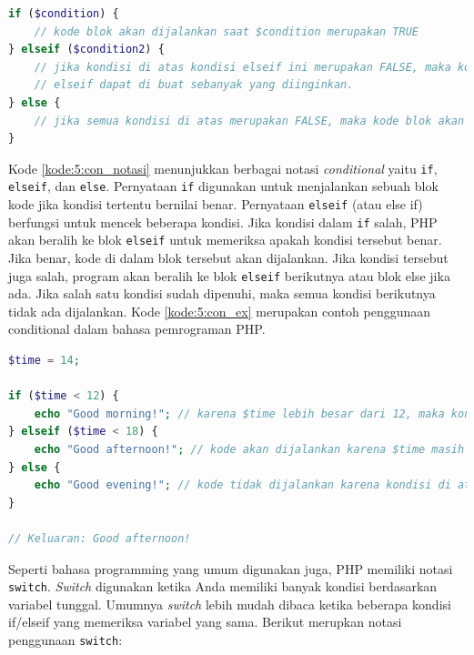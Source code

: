 \documentclass[a4paper,twoside]{article}
\begin{document}
\begin{enumerate}
\begin{itemize}
		            \begin{lstlisting}[language={php}, caption={Notasi conditional}, label={kode:5:con_notasi}]
if ($condition) {
	// kode blok akan dijalankan saat $condition merupakan TRUE
} elseif ($condition2) {
	// jika kondisi di atas kondisi elseif ini merupakan FALSE, maka kode blok dapat dijalankan saat $condition2 merupakan TRUE.
	// elseif dapat di buat sebanyak yang diinginkan.
} else {
	// jika semua kondisi di atas merupakan FALSE, maka kode blok akan dijalankan.
}
			  		\end{lstlisting}

		            Kode \ref{kode:5:con_notasi} menunjukkan berbagai notasi \textit{conditional} yaitu \verb|if|, \verb|elseif|, dan \verb|else|.
		            Pernyataan \verb|if| digunakan untuk menjalankan sebuah blok kode jika kondisi tertentu bernilai benar.
		            Pernyataan \verb|elseif| (atau else if) berfungsi untuk mencek beberapa kondisi. Jika kondisi dalam \verb|if| salah, PHP akan beralih ke blok \verb|elseif| untuk memeriksa apakah kondisi tersebut benar. Jika benar, kode di dalam blok tersebut akan dijalankan. Jika kondisi tersebut juga salah, program akan beralih ke blok \verb|elseif| berikutnya atau blok else jika ada.
		            Jika salah satu kondisi sudah dipenuhi, maka semua kondisi berikutnya tidak ada dijalankan.
		            Kode \ref{kode:5:con_ex} merupakan contoh penggunaan conditional dalam bahasa pemrograman PHP.

		            \begin{lstlisting}[language={php}, caption={Contoh Penggunaan Conditional}, label={kode:5:con_ex}]
$time = 14;

if ($time < 12) {
	echo "Good morning!"; // karena $time lebih besar dari 12, maka kondisi pertama gagal.
} elseif ($time < 18) {
	echo "Good afternoon!"; // kode akan dijalankan karena $time masih lebih kecil dari 18.
} else {
	echo "Good evening!"; // kode tidak dijalankan karena kondisi di atas sudah ada yang memenuhi.
}

// Keluaran: Good afternoon!
			  		\end{lstlisting}

		            Seperti bahasa programming yang umum digunakan juga, PHP memiliki notasi \verb|switch|. \textit{Switch} digunakan ketika Anda memiliki banyak kondisi berdasarkan variabel tunggal. Umumnya \textit{switch} lebih mudah dibaca ketika beberapa kondisi if/elseif yang memeriksa variabel yang sama.
		            Berikut merupkan notasi penggunaan \verb|switch|:


\end{itemize}
\end{enumerate}
\end{document}
